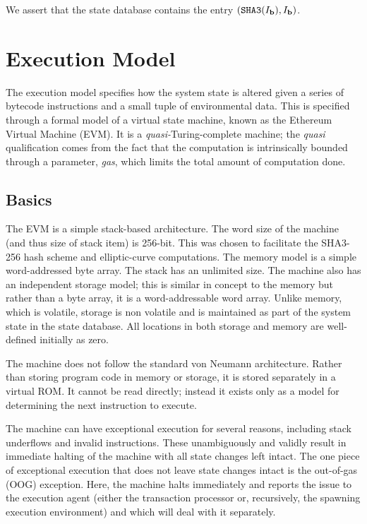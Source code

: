 \documentclass[9pt,oneside]{amsart}
\begin{document}
\begin{multicols}{2}
We assert that the state database contains the entry $(\mathtt{\tiny SHA3}(I_\mathbf{b}), I_\mathbf{b})$.

\section{Execution Model} \label{ch:model}

The execution model specifies how the system state is altered given a series of bytecode instructions and a small tuple of environmental data. This is specified through a formal model of a virtual state machine, known as the Ethereum Virtual Machine (EVM). It is a \textit{quasi-}Turing-complete machine; the \textit{quasi} qualification comes from the fact that the computation is intrinsically bounded through a parameter, \textit{gas}, which limits the total amount of computation done.

\subsection{Basics}

The EVM is a simple stack-based architecture. The word size of the machine (and thus size of stack item) is 256-bit. This was chosen to facilitate the SHA3-256 hash scheme and elliptic-curve computations. The memory model is a simple word-addressed byte array. The stack has an unlimited size. The machine also has an independent storage model; this is similar in concept to the memory but rather than a byte array, it is a word-addressable word array. Unlike memory, which is volatile, storage is non volatile and is maintained as part of the system state in the state database. All locations in both storage and memory are well-defined initially as zero.

The machine does not follow the standard von Neumann architecture. Rather than storing program code in memory or storage, it is stored separately in a virtual ROM. It cannot be read directly; instead it exists only as a model for determining the next instruction to execute.

The machine can have exceptional execution for several reasons, including stack underflows and invalid instructions. These unambiguously and validly result in immediate halting of the machine with all state changes left intact. The one piece of exceptional execution that does not leave state changes intact is the out-of-gas (OOG) exception. Here, the machine halts immediately and reports the issue to the execution agent (either the transaction processor or, recursively, the spawning execution environment) and which will deal with it separately.


\end{multicols}
\end{document}
